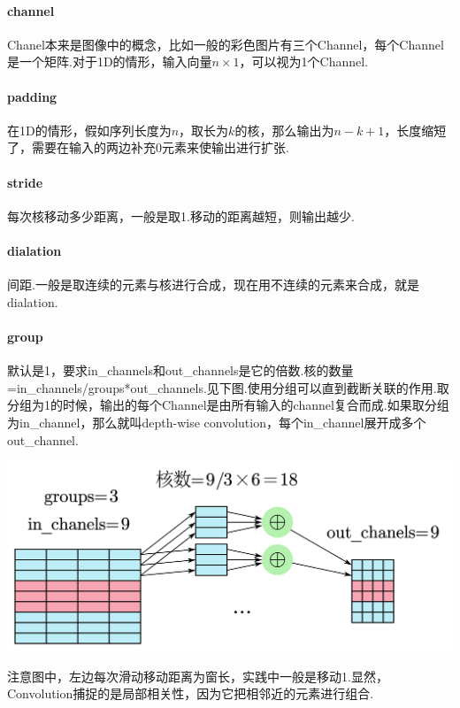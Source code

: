 \paragraph*{channel}Chanel本来是图像中的概念，比如一般的彩色图片有三个Channel，每个Channel是一个矩阵.对于1D的情形，输入向量$n\times1$，可以视为1个Channel.

\paragraph*{padding}在1D的情形，假如序列长度为$n$，取长为$k$的核，那么输出为$n-k+1$，长度缩短了，需要在输入的两边补充0元素来使输出进行扩张.

\paragraph*{stride}每次核移动多少距离，一般是取1.移动的距离越短，则输出越少.

\paragraph*{dialation}间距.一般是取连续的元素与核进行合成，现在用不连续的元素来合成，就是dialation.

\paragraph*{group}默认是1，要求in\_channels和out\_channels是它的倍数.核的数量=in\_channels/groups*out\_channels.见下图.使用分组可以直到截断关联的作用.取分组为1的时候，输出的每个Channel是由所有输入的channel复合而成.如果取分组为in\_channel，那么就叫depth-wise convolution，每个in\_channel展开成多个out\_channel.

\includegraphics[width=\textwidth]{figure/Convolution-Groups.png}

注意图中，左边每次滑动移动距离为窗长，实践中一般是移动1.显然，Convolution捕捉的是局部相关性，因为它把相邻近的元素进行组合.

